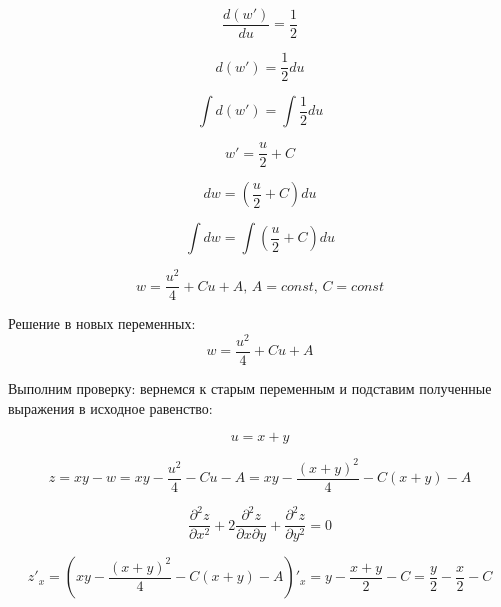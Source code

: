 \documentclass[a5paper, 10pt]{article}
\theoremstyle{definition}
\theoremstyle{plain}
\theoremstyle{remark}
\begin{document}
\begin{equation}
 \frac{d(w')}{du}  = \frac{1}{2}
\end{equation}

\begin{equation}
 d(w')  = \frac{1}{2} du
\end{equation}

\begin{equation}
 \int d(w')  = \int \frac{1}{2} du
\end{equation}

\begin{equation}
 w' =  \frac{u}{2} + C
\end{equation}

\begin{equation}
 dw = \left( \frac{u}{2} + C \right) du
\end{equation}

\begin{equation}
 \int dw =\int  \left( \frac{u}{2} + C \right) du
\end{equation}

\begin{equation}
 w =  \frac{u^2}{4} + Cu + A, \, A = const, \, C = const
\end{equation}

Решение в новых переменных:
\begin{equation}
 w =  \frac{u^2}{4} + Cu + A
\end{equation}

Выполним проверку: вернемся к старым переменным и подставим полученные выражения в исходное равенство:


\begin{equation}
u = x + y
\end{equation}

\begin{equation}
z = xy - w = xy -  \frac{u^2}{4} - Cu - A =  xy -  \frac{( x + y)^2}{4} - C( x + y) - A
\end{equation}

\begin{equation}
\frac{\partial^2 z}{\partial x^2} + 2 \frac{\partial^2 z}{\partial x \partial y} + \frac{\partial^2 z}{\partial y^2} = 0
\end{equation}

\begin{equation}
z'_x = \left(  xy -  \frac{( x + y)^2}{4} - C( x + y) - A \right)'_x = y - \frac{ x + y}{2}  -C = \frac{y}{2} - \frac{ x}{2} -C
\end{equation}
\end{document}

